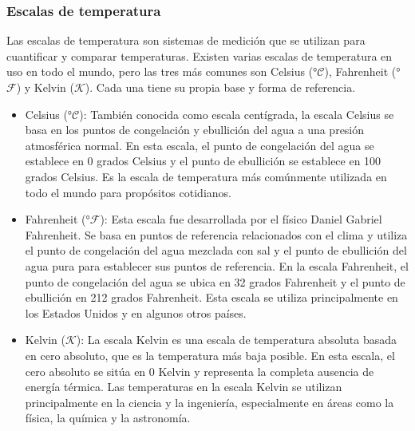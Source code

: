 \documentclass[letterpaper, 12pt]{article}
\newcommand{\Celsius}[0]{°$\mathcal{C}$}
\newcommand{\Kelvin}[0]{$\mathcal{K}$}
\newcommand{\Fahrenheit}[0]{°$\mathcal{F}$}
\begin{document}
\subsubsection{Escalas de temperatura}

Las escalas de temperatura son sistemas de medición que se
utilizan para cuantificar y comparar temperaturas. Existen
varias escalas de temperatura en uso en todo el mundo, pero
las tres más comunes son Celsius (\Celsius), Fahrenheit
(\Fahrenheit) y Kelvin (\Kelvin). Cada una tiene su propia
base y forma de referencia.

\begin{itemize}[label=$\triangleright$]
      \item Celsius (\Celsius): También conocida como escala
            centígrada, la escala Celsius se basa en los puntos de
            congelación y ebullición del agua a una presión atmosférica
            normal. En esta escala, el punto de congelación del agua se
            establece en 0 grados Celsius y el punto de ebullición se
            establece en 100 grados Celsius. Es la escala de
            temperatura más comúnmente utilizada en todo el mundo para
            propósitos cotidianos.

      \item Fahrenheit (\Fahrenheit): Esta escala fue desarrollada por
            el físico Daniel Gabriel Fahrenheit. Se basa en puntos de
            referencia relacionados con el clima y utiliza el punto de
            congelación del agua mezclada con sal y el punto de
            ebullición del agua pura para establecer sus puntos de
            referencia. En la escala Fahrenheit, el punto de
            congelación del agua se ubica en 32 grados Fahrenheit y el
            punto de ebullición en 212 grados Fahrenheit. Esta escala
            se utiliza principalmente en los Estados Unidos y en
            algunos otros países.

      \item Kelvin (\Kelvin): La escala Kelvin es una escala de
            temperatura absoluta basada en cero absoluto, que es la
            temperatura más baja posible. En esta escala, el cero
            absoluto se sitúa en 0 Kelvin y representa la completa
            ausencia de energía térmica. Las temperaturas en la escala
            Kelvin se utilizan principalmente en la ciencia y la
            ingeniería, especialmente en áreas como la física, la
            química y la astronomía.
\end{itemize}
\end{document}
